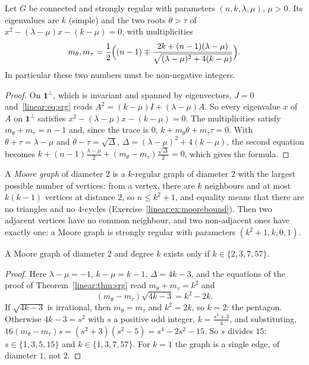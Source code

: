 \begin{theorem}\label{linear:thm:srg}
Let $G$ be connected and strongly regular with parameters $(n,k,\lambda,\mu)$, $\mu>0$. Its eigenvalues are $k$ (simple) and the
two roots $\theta>\tau$ of $x^2-(\lambda-\mu)x-(k-\mu)=0$, with multiplicities
\[
m_{\theta},m_\tau=\frac12\Bigl((n-1)\mp\frac{2k+(n-1)(\lambda-\mu)}{\sqrt{(\lambda-\mu)^2+4(k-\mu)}}\Bigr).
\]
In particular these two numbers must be non-negative integers.
\end{theorem}
\begin{proof}
On $\mathbf 1^\perp$, which is invariant and spanned by eigenvectors, $J=0$ and~\eqref{linear:eq:srg} reads $A^2=(k-\mu)I+(\lambda-\mu)A$. So
every eigenvalue $x$ of $A$ on $\mathbf 1^\perp$ satisfies $x^2-(\lambda-\mu)x-(k-\mu)=0$. The multiplicities satisfy $m_\theta+m_\tau=n-1$
and, since the trace is $0$, $k+m_\theta\theta+m_\tau\tau=0$. With $\theta+\tau=\lambda-\mu$ and $\theta-\tau=\sqrt\Delta$,
$\Delta=(\lambda-\mu)^2+4(k-\mu)$, the second equation becomes $k+(n-1)\frac{\lambda-\mu}2+(m_\theta-m_\tau)\frac{\sqrt\Delta}2=0$,
which gives the formula.
\end{proof}

A \emph{Moore graph} of diameter $2$ is a $k$-regular graph of diameter $2$ with the largest possible number of vertices: from a
vertex, there are $k$ neighbours and at most $k(k-1)$ vertices at distance $2$, so $n\le k^2+1$, and equality means that there are no
triangles and no $4$-cycles (Exercise~\ref{linear:ex:moorebound}). Then two adjacent vertices have no common neighbour, and two non-adjacent
ones have exactly one: a Moore graph is strongly regular with parameters $(k^2+1,k,0,1)$.

\begin{theorem}\label{linear:thm:moore}
A Moore graph of diameter $2$ and degree $k$ exists only if $k\in\{2,3,7,57\}$.
\end{theorem}
\begin{proof}
Here $\lambda-\mu=-1$, $k-\mu=k-1$, $\Delta=4k-3$, and the equations of the proof of Theorem~\ref{linear:thm:srg} read $m_\theta+m_\tau=k^2$
and
\[
(m_\theta-m_\tau)\sqrt{4k-3}=k^2-2k.
\]
If $\sqrt{4k-3}$ is irrational, then $m_\theta=m_\tau$ and $k^2=2k$, so $k=2$: the pentagon. Otherwise $4k-3=s^2$ with $s$ a positive
odd integer, $k=\frac{s^2+3}4$, and substituting, $16(m_\theta-m_\tau)s=(s^2+3)(s^2-5)=s^4-2s^2-15$. So $s$ divides $15$:
$s\in\{1,3,5,15\}$ and $k\in\{1,3,7,57\}$. For $k=1$ the graph is a single edge, of diameter $1$, not $2$.
\end{proof}


